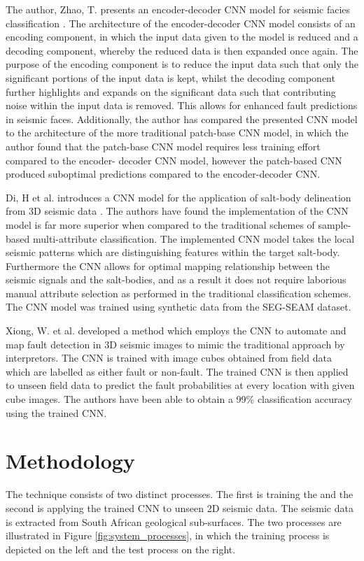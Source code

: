 \documentclass[preprint,12pt]{elsarticle}
\begin{document}
The author, Zhao, T. presents an encoder-decoder CNN model for seismic
facies classification \cite{zhao2018seismic}. The architecture of the encoder-decoder CNN model
consists of an encoding component, in which the input data given to the
model is reduced and a decoding component, whereby the reduced data is
then expanded once again. The purpose of the encoding component is to
reduce the input data such that only the significant portions of the input data
is kept, whilst the decoding component further highlights and expands on the
significant data such that contributing noise within the input data is removed.
This allows for enhanced fault predictions in seismic faces. Additionally, the
author has compared the presented CNN model to the architecture of the
more traditional patch-base CNN model, in which the author found that the
patch-base CNN model requires less training effort compared to the encoder-
decoder CNN model, however the patch-based CNN produced suboptimal
predictions compared to the encoder-decoder CNN.

Di, H et al. introduces a CNN model for the application of salt-body
delineation from 3D seismic data \cite{di2018deep}. The authors have found the implementation
of the CNN model is far more superior when compared to the traditional
schemes of sample-based multi-attribute classification. The implemented
CNN model takes the local seismic patterns which are distinguishing
features within the target salt-body. Furthermore the CNN allows for optimal
mapping relationship between the seismic signals and the salt-bodies,
and as a result it does not require laborious manual attribute selection as
performed in the traditional classification schemes. The CNN model was
trained using synthetic data from the SEG-SEAM dataset.

Xiong, W. et al. developed a method which employs the CNN to automate
and map fault detection in 3D seismic images to mimic the traditional
approach by interpretors. The CNN is trained with image cubes obtained
from field data which are labelled as either fault or non-fault. The trained
CNN is then applied to unseen field data to predict the fault probabilities at
every location with given cube images. The authors have been able to obtain
a 99\% classification accuracy using the trained CNN.

\section{Methodology}
\label{sec:methodology}
The technique consists of two distinct processes. The first is training the
and the second is applying the trained CNN to unseen 2D seismic data. The seismic
data is extracted from South African geological sub-surfaces. The two processes are
illustrated in Figure \ref{fig:system_processes}, in which the training process is depicted on the left and
the test process on the right.
\end{document}
